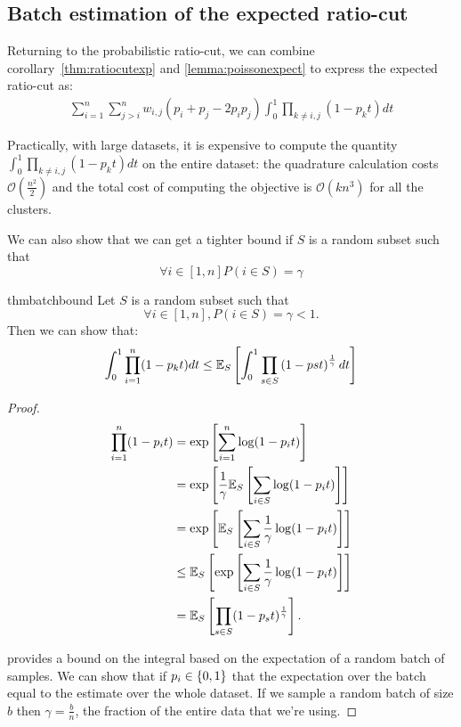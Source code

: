 \subsection{Batch estimation of the expected ratio-cut}\label{appendix:batchestimate}

Returning to the probabilistic ratio-cut, we can combine
corollary~\cref{thm:ratiocutexp} and \cref{lemma:poissonexpect} to express the
expected ratio-cut as:
\begin{align*}
	\sum_{i=1}^{n}\sum_{j>i}^{n} w_{i,j}(p_i + p_j  -2 p_i p_j)
	\int_{0}^{1} \prod_{k\neq i,j} (1-p_k t)dt
\end{align*}

Practically, with large datasets, it is expensive to compute the quantity
$\int_{0}^{1} \prod_{k\neq i,j} (1-p_k t)dt$ on the entire dataset: the quadrature
calculation costs $\mathcal{O}(\frac{n^2}{2})$ and the total cost of computing the
objective is $\mathcal{O}(k n^3)$ for all the clusters.

We can also show that we can get a tighter bound if $S$ is a random subset such
that
\[
	\forall i\in[1,n] P(i\in S) = \gamma
\]

\begin{restatable}{thm}{batchbound}
	\label{thm:batchbound}
	Let $S$ is a random subset such
	that
	\[
		\forall i\in[1,n], P(i\in S) = \gamma < 1.
	\]
	Then we can show that:
	\begin{align}
		\int_{0}^{1} \prod_{i=1}^{n} (1-p_k t)dt \leq
		\mathbb{E}_{S}\left[\int_{0}^{1}\prod_{s\in S} \left(1- p{s}t\right)^{{\frac{1}{\gamma}}}dt\right]
	\end{align}
\end{restatable}
\begin{proof}

	\begin{align*}
		\prod_{i=1}^n (1- p_{i}t)
		 & = \exp\left[\sum_{i=1}^n \log(1- p_i t)\right]                       \\
		 & = \exp\left[{\frac{1}{\gamma}} \mathbb{E}_{S}\left[\sum_{i\in S}\log(1- p_i t)\right]\right]   \\
		 & = \exp\left[\mathbb{E}_{S}\left[\sum_{i\in S}{\frac{1}{\gamma}} \log(1- p_i t)\right]\right]   \\
		 & \leq \mathbb{E}_{S}\left[\exp\left[\sum_{i\in S}{\frac{1}{\gamma}}\log(1- p_i t)\right]\right] \\
		 & = \mathbb{E}_{S}\left[\prod_{s\in S} (1- p_st)^{\frac{1}{\gamma}}\right].
	\end{align*}

	 provides a bound on the integral based on the
	expectation of a random batch of samples. We can show that if $p_i\in\left\lbrace0,1\right\rbrace$ that
	the expectation over the batch equal to the estimate over the whole dataset. If we sample
	a random batch of size $b$ then $\gamma=\frac{b}{n}$, the fraction of the entire data
	that we're using.
\end{proof}
